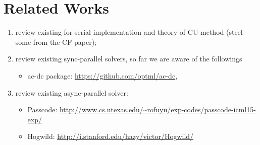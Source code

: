 \section{Related Works}
\begin{enumerate}
\item review existing for serial implementation and theory of CU method (steel some from the CF paper);
\item review existing sync-parallel solvers, so far we are aware of the followings 
\begin{itemize}
\item ac-dc package: \url{https://github.com/optml/ac-dc}, 
\end{itemize}
\item review existing async-parallel solver:
\begin{itemize}
\item Passcode: \url{http://www.cs.utexas.edu/~rofuyu/exp-codes/passcode-icml15-exp/}
\item Hogwild: \url{http://i.stanford.edu/hazy/victor/Hogwild/}
\end{itemize}

\end{enumerate}
